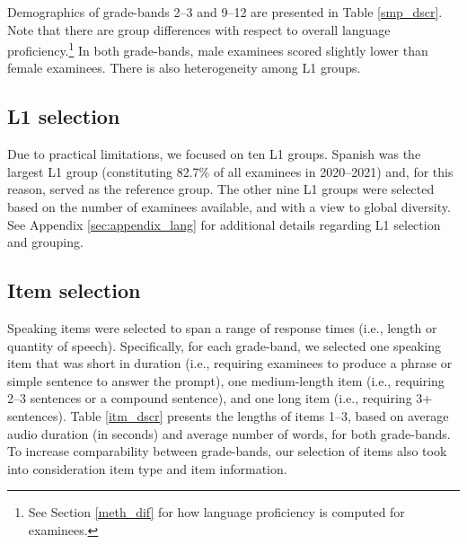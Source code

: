 \documentclass [PhD] {uclathes}
\begin{document}
Demographics of grade-bands 2–3 and 9–12 are presented in Table \ref{smp_dscr}. Note that there are group differences with respect to overall language proficiency.\footnote{See Section \ref{meth_dif} for how language proficiency is computed for examinees.} In both grade-bands, male examinees scored slightly lower than female examinees. There is also heterogeneity among L1 groups.

\subsection{L1 selection}

Due to practical limitations, we focused on ten L1 groups. Spanish was the largest L1 group (constituting 82.7\% of all examinees in 2020–2021) and, for this reason, served as the reference group. The other nine L1 groups were selected based on the number of examinees available, and with a view to global diversity. See Appendix \ref{sec:appendix_lang} for additional details regarding L1 selection and grouping.

\subsection{Item selection}

Speaking items were selected to span a range of response times (i.e., length or quantity of speech). Specifically, for each grade-band, we selected one speaking item that was short in duration (i.e., requiring examinees to produce a phrase or simple sentence to answer the prompt), one medium-length item (i.e., requiring 2–3 sentences or a compound sentence), and one long item (i.e., requiring 3+ sentences). Table \ref{itm_dscr} presents the lengths of items 1–3, based on average audio duration (in seconds) and average number of words, for both grade-bands. To increase comparability between grade-bands, our selection of items also took into consideration item type and item information. 
\end{document}
